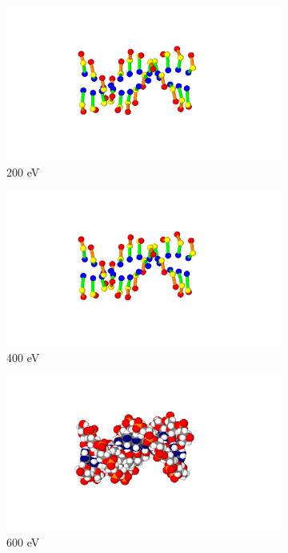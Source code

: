 \begin{figure}
\centering
\begin{subfigure}{.5\textwidth}
  \centering
  \includegraphics[width=.78\linewidth]{./Figures/1fzxresid.png}
  \caption{200 eV}
  \label{fig:sub111}
\end{subfigure}%
\begin{subfigure}{.5\textwidth}
  \centering
  \includegraphics[width=.78\linewidth]{./Figures/1fzxresid.png}
  \caption{400 eV}
  \label{fig:sub22}
\end{subfigure}
\begin{subfigure}{.5\textwidth}
  \centering
  \includegraphics[width=.78\linewidth]{./Figures/1fzxvdw.png}
  \caption{600 eV}
  \label{fig:sub33}
\end{subfigure}%
\begin{subfigure}{.5\textwidth}
  \centering

\end{subfigure}
\end{figure}
